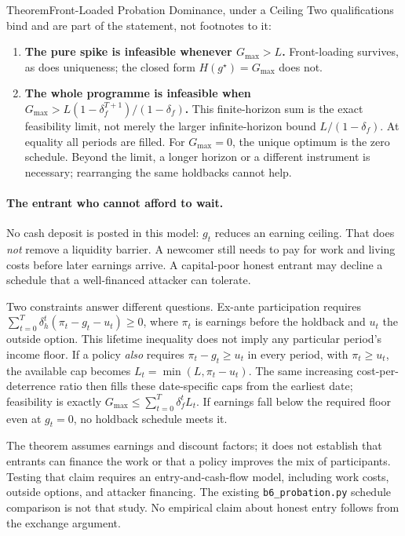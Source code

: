 \documentclass[11pt,a4paper]{article}
\theoremstyle{definition}
\begin{document}
\begin{pdclaim}{Theorem}{Front-Loaded Probation Dominance, \mbox{under} a Ceiling}
Two
qualifications bind and are part of the statement, not footnotes to it:
\begin{enumerate}[leftmargin=1.6em,itemsep=1pt]
  \item \textbf{The pure spike is infeasible whenever $G_{\max}>L$.} Front-loading
  survives, as does uniqueness; the closed form $H(g^\star)=G_{\max}$ does not.
  \item \textbf{The whole programme is infeasible when
  $G_{\max}>L(1-\delta_f^{T+1})/(1-\delta_f)$.} This finite-horizon sum is the
  exact feasibility limit, not merely the larger infinite-horizon bound
  $L/(1-\delta_f)$. At equality all periods are filled. For $G_{\max}=0$, the
  unique optimum is the zero schedule. Beyond the limit, a longer horizon or a
  different instrument is necessary; rearranging the same holdbacks cannot help.
\end{enumerate}
\end{pdclaim}

\paragraph{The entrant who cannot afford to wait.}
\pdprobationcapacity
No cash deposit is posted in this model: $g_t$ reduces an earning ceiling.
That does \emph{not} remove a liquidity barrier. A newcomer still needs to pay
for work and living costs before later earnings arrive. A capital-poor honest
entrant may decline a schedule that a well-financed attacker can tolerate.

Two constraints answer different questions. Ex-ante participation requires
$\sum_{t=0}^T\delta_h^t(\pi_t-g_t-u_t)\ge0$, where $\pi_t$ is earnings before
the holdback and $u_t$ the outside option. This lifetime inequality does not
imply any particular period's income floor. If a policy \emph{also} requires
$\pi_t-g_t\ge u_t$ in every period, with $\pi_t\ge u_t$, the available cap
becomes $L_t=\min(L,\pi_t-u_t)$. The same increasing cost-per-deterrence ratio
then fills these date-specific caps from the earliest date; feasibility is
exactly $G_{\max}\le\sum_{t=0}^T\delta_f^tL_t$. If earnings fall below the
required floor even at $g_t=0$, no holdback schedule meets it.

The theorem assumes earnings and discount factors; it does not establish that
entrants can finance the work or that a policy improves the mix of participants.
Testing that claim requires an entry-and-cash-flow model, including work costs,
outside options, and attacker financing. The existing
\texttt{b6\_probation.py} schedule comparison is not that study. No empirical
claim about honest entry follows from the exchange argument.
\end{document}
